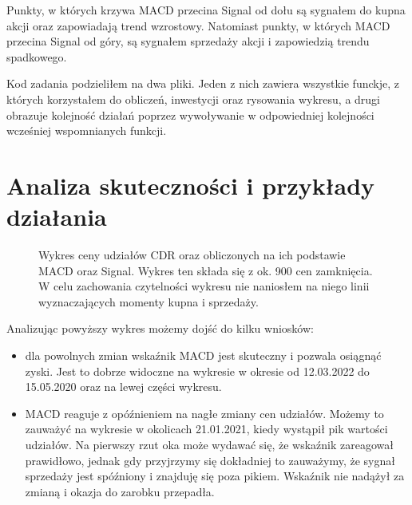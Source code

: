 \documentclass{article}
\begin{document}
    Punkty, w których krzywa MACD przecina Signal od dołu są sygnałem do kupna akcji oraz zapowiadają trend wzrostowy.
    Natomiast punkty, w których MACD przecina Signal od góry, są sygnałem sprzedaży akcji i zapowiedzią trendu spadkowego. 
    
    Kod zadania podzieliłem na dwa pliki. Jeden z nich zawiera wszystkie funckje, z których korzystałem do obliczeń, inwestycji oraz rysowania wykresu,
     a drugi obrazuje kolejność działań poprzez wywoływanie w odpowiedniej kolejności wcześniej wspomnianych funkcji.
\section{Analiza skuteczności i przykłady działania}
    \begin{figure}[H]
        \noindent{}
        \caption{Wykres ceny udziałów CDR oraz obliczonych na ich podstawie MACD oraz Signal. Wykres ten składa się z ok. 900 cen zamknięcia.
         W celu zachowania czytelności wykresu nie naniosłem na niego linii wyznaczających momenty kupna i sprzedaży.}
    \end{figure}

    Analizując powyższy wykres możemy dojść do kilku wniosków:
    \begin{itemize}
        \item dla powolnych zmian wskaźnik MACD jest skuteczny i pozwala osiągnąć zyski. Jest to dobrze widoczne na wykresie w okresie od 12.03.2022 do 15.05.2020 oraz na lewej części wykresu.
        \item MACD reaguje z opóźnieniem na nagłe zmiany cen udziałów. Możemy to zauważyć na wykresie w okolicach 21.01.2021, kiedy wystąpił pik wartości udziałów.
         Na pierwszy rzut oka może wydawać się, że wskaźnik zareagował prawidłowo, jednak gdy przyjrzymy się dokładniej to zauważymy, że sygnał sprzedaży jest spóźniony i znajduję się poza pikiem.
         Wskaźnik nie nadążył za zmianą i okazja do zarobku przepadła.
    \end{itemize}
\newpage
\end{document}

